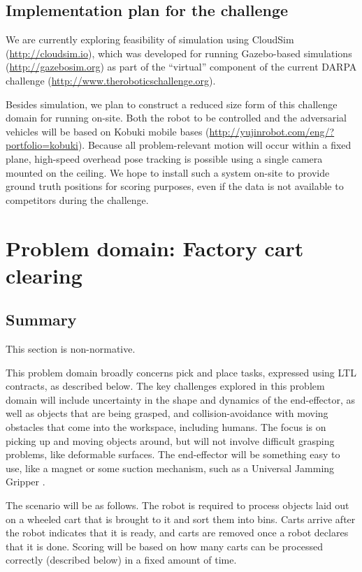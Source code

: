 \documentclass{amsart}
\theoremstyle{definition}
\begin{document}
\subsection{Implementation plan for the challenge}

We are currently exploring feasibility of simulation using CloudSim
(\url{http://cloudsim.io}), which was developed for running Gazebo-based
simulations (\url{http://gazebosim.org}) as part of the ``virtual'' component of
the current DARPA challenge (\url{http://www.theroboticschallenge.org}).

Besides simulation, we plan to construct a reduced size form of this challenge
domain for running on-site.  Both the robot to be controlled and the
adversarial vehicles will be based on Kobuki mobile bases
(\url{http://yujinrobot.com/eng/?portfolio=kobuki}).  Because all
problem-relevant motion will occur within a fixed plane, high-speed overhead
pose tracking is possible using a single camera mounted on the ceiling.  We hope
to install such a system on-site to provide ground truth positions for
scoring purposes, even if the data is not available to competitors during the
challenge.

\section{Problem domain: Factory cart clearing}\label{sec:cartclearing}

\subsection{Summary}

This section is non-normative.\newline

This problem domain broadly concerns pick and place tasks, expressed using LTL
contracts, as described below. The key challenges explored in this problem
domain will include uncertainty in the shape and dynamics of the end-effector,
as well as objects that are being grasped, and collision-avoidance with moving
obstacles that come into the workspace, including humans. The focus is on
picking up and moving objects around, but will not involve difficult grasping
problems, like deformable surfaces. The end-effector will be something easy to
use, like a magnet or some suction mechanism, such as a Universal Jamming
Gripper \cite{AmendBRJL12}.

The scenario will be as follows. The robot is required to process objects laid
out on a wheeled cart that is brought to it and sort them into bins. Carts arrive after
the robot indicates that it is ready, and carts are removed once a robot
declares that it is done. Scoring will be based on how many carts can be
processed correctly (described below) in a fixed amount of time.
\end{document}
